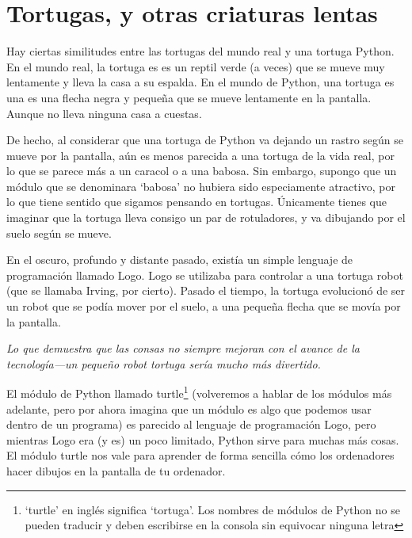 

\chapter{Tortugas, y otras criaturas lentas}\label{ch:turtles}

Hay ciertas similitudes entre las tortugas del mundo real y una tortuga Python. En el mundo real, la tortuga es es un reptil verde (a veces) que se mueve muy lentamente y lleva la casa a su espalda.  En el mundo de Python, una tortuga es una es una flecha negra y pequeña que se mueve lentamente en la pantalla. Aunque no lleva ninguna casa a cuestas.

De hecho, al considerar que una tortuga de Python va dejando un rastro según se mueve por la pantalla, aún es menos parecida a una tortuga de la vida real, por lo que se parece más a un caracol o a una babosa. Sin embargo, supongo que un módulo que se denominara `babosa' no hubiera sido especiamente atractivo, por lo que tiene sentido que sigamos pensando en tortugas. Únicamente tienes que imaginar que la tortuga lleva consigo un par de rotuladores, y va dibujando por el suelo según se mueve.

En el oscuro, profundo y distante pasado, existía un simple lenguaje de programación llamado Logo. Logo se utilizaba para controlar a una tortuga robot (que se llamaba Irving, por cierto). Pasado el tiempo, la tortuga evolucionó de ser un robot que se podía mover por el suelo, a una pequeña flecha que se movía por la pantalla.

\emph{Lo que demuestra que las consas no siempre mejoran con el avance de la tecnología---un pequeño robot tortuga sería mucho más divertido.}

El módulo de Python llamado turtle\footnote{`turtle' en inglés significa `tortuga'. Los nombres de módulos de Python no se pueden traducir y deben escribirse en la consola sin equivocar ninguna letra} (volveremos a hablar de los módulos más adelante, pero por ahora imagina que un módulo es algo que podemos usar dentro de un programa) es parecido al lenguaje de programación Logo, pero mientras Logo era (y es) un poco limitado, Python sirve para muchas más cosas.  El módulo turtle nos vale para aprender de forma sencilla cómo los ordenadores hacer dibujos en la pantalla de tu ordenador.

